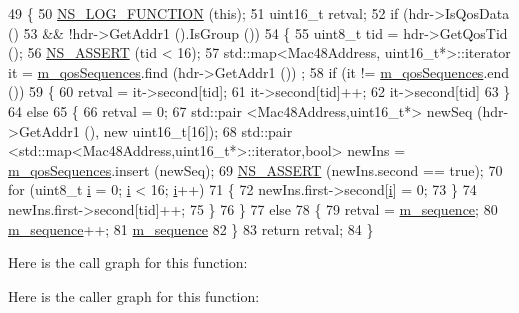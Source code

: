 \begin{DoxyCode}
49 \{
50   \hyperlink{log-macros-disabled_8h_a90b90d5bad1f39cb1b64923ea94c0761}{NS\_LOG\_FUNCTION} (\textcolor{keyword}{this});
51   uint16\_t retval;
52   \textcolor{keywordflow}{if} (hdr->IsQosData ()
53       && !hdr->GetAddr1 ().IsGroup ())
54     \{
55       uint8\_t tid = hdr->GetQosTid ();
56       \hyperlink{assert_8h_a6dccdb0de9b252f60088ce281c49d052}{NS\_ASSERT} (tid < 16);
57       std::map<Mac48Address, uint16\_t*>::iterator it = \hyperlink{classns3_1_1MacTxMiddle_ac772ae494e77aa273bece9a75f002202}{m\_qosSequences}.find (hdr->GetAddr1 ())
      ;
58       \textcolor{keywordflow}{if} (it != \hyperlink{classns3_1_1MacTxMiddle_ac772ae494e77aa273bece9a75f002202}{m\_qosSequences}.end ())
59         \{
60           retval = it->second[tid];
61           it->second[tid]++;
62           it->second[tid] %
63         \}
64       \textcolor{keywordflow}{else}
65         \{
66           retval = 0;
67           std::pair <Mac48Address,uint16\_t*> newSeq (hdr->GetAddr1 (), \textcolor{keyword}{new} uint16\_t[16]);
68           std::pair <std::map<Mac48Address,uint16\_t*>::iterator,\textcolor{keywordtype}{bool}> newIns = 
      \hyperlink{classns3_1_1MacTxMiddle_ac772ae494e77aa273bece9a75f002202}{m\_qosSequences}.insert (newSeq);
69           \hyperlink{assert_8h_a6dccdb0de9b252f60088ce281c49d052}{NS\_ASSERT} (newIns.second == \textcolor{keyword}{true});
70           \textcolor{keywordflow}{for} (uint8\_t \hyperlink{bernuolliDistribution_8m_a6f6ccfcf58b31cb6412107d9d5281426}{i} = 0; \hyperlink{bernuolliDistribution_8m_a6f6ccfcf58b31cb6412107d9d5281426}{i} < 16; \hyperlink{bernuolliDistribution_8m_a6f6ccfcf58b31cb6412107d9d5281426}{i}++)
71             \{
72               newIns.first->second[\hyperlink{bernuolliDistribution_8m_a6f6ccfcf58b31cb6412107d9d5281426}{i}] = 0;
73             \}
74           newIns.first->second[tid]++;
75         \}
76     \}
77   \textcolor{keywordflow}{else}
78     \{
79       retval = \hyperlink{classns3_1_1MacTxMiddle_a5b304f299ca20dc220dece4cab00d322}{m\_sequence};
80       \hyperlink{classns3_1_1MacTxMiddle_a5b304f299ca20dc220dece4cab00d322}{m\_sequence}++;
81       \hyperlink{classns3_1_1MacTxMiddle_a5b304f299ca20dc220dece4cab00d322}{m\_sequence} %
82     \}
83   \textcolor{keywordflow}{return} retval;
84 \}
\end{DoxyCode}


Here is the call graph for this function\+:




Here is the caller graph for this function\+:


